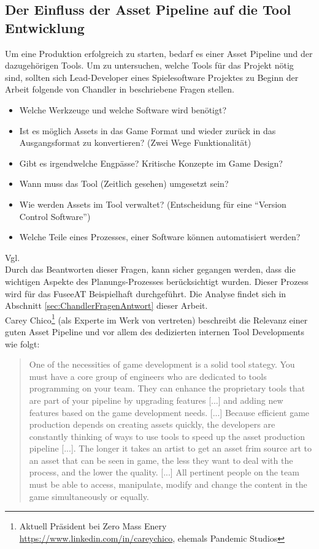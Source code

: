 \documentclass[pagesize, paper=a4, fontsize=12pt, titlepage=true, headings=small, headnosepline, abstractoff, liststotoc, nochapterprefix, plainheadsepline, twoside]{scrreprt}
\begin{document}
\subsection {Der Einfluss der Asset Pipeline auf die Tool Entwicklung}\label{sec:ChandlerFragenKatalog}
Um eine Produktion erfolgreich zu starten, bedarf es einer Asset Pipeline und der dazugehörigen Tools. Um zu untersuchen, welche Tools für das Projekt nötig sind, sollten sich Lead-Developer eines Spielesoftware Projektes zu Beginn der Arbeit folgende von Chandler in \parencite[S 223-224]{Chandler2006} beschriebene Fragen stellen.
\begin{itemize}
\item Welche Werkzeuge und welche Software wird benötigt?
\item Ist es möglich Assets in das Game Format und wieder zurück in das Ausgangsformat zu konvertieren? (Zwei Wege Funktionalität)
\item Gibt es irgendwelche Engpässe? Kritische Konzepte im Game Design?
\item Wann muss das Tool (Zeitlich gesehen) umgesetzt sein?
\item Wie werden Assets im Tool verwaltet? (Entscheidung für eine “Version Control Software”)
\item Welche Teile eines Prozesses, einer Software können automatisiert werden?
\end{itemize} Vgl. \autocite[S. 224-225]{Chandler2006}
\\
Durch das Beantworten dieser Fragen, kann sicher gegangen werden, dass die wichtigen Aspekte des Planungs-Prozesses berücksichtigt wurden. Dieser Prozess wird für das FuseeAT Beispielhaft durchgeführt. Die Analyse findet sich in Abschnitt \ref{sec:ChandlerFragenAntwort} dieser Arbeit.
\\
Carey Chico\footnote{Aktuell Präsident bei Zero Mass Enery \url{https://www.linkedin.com/in/careychico}, ehemals Pandemic Studios} (als Experte im Werk von \cite{Chandler2006} vertreten) beschreibt die Relevanz einer guten Asset Pipeline und vor allem des dedizierten internen Tool Developments wie folgt:
\begin{quote}
\glqq One of the necessities of game development is a solid tool stategy. You must have a core group of engineers who are dedicated to tools programming on your team. They can enhance the proprietary tools that are part of your pipeline by upgrading features [...] and adding new features based on the game development needs. [...] Because efficient game production depends on creating assets quickly, the developers are constantly thinking of ways to use tools to speed up the asset production pipeline [...]. The longer it takes an artist to get an asset frim source art to an asset that can be seen in game, the less they want to deal with the process, and the lower the quality.
[...]
All pertinent people on the team must be able to access, manipulate, modify and change the content in the game simultaneously or equally.\grqq{}
\autocite[S. 224-225]{Chandler2006}
\end{quote}
\end{document}

